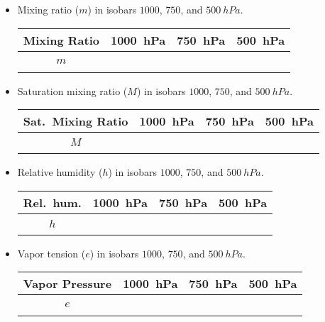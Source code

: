 \documentclass{article}
\begin{document}
\begin{itemize}

\item Mixing ratio ($m$) in isobars $1000$, $750$, and $\SI{500}{hPa}$.

\begin{tabular}{|c|c|c|c|}
\hline
Mixing Ratio&\SI{1000}{hPa} &\SI{750}{hPa} &\SI{500}{hPa} \\
\hline
$m$ &~\hspace{2.25cm}~&~\hspace{2.25cm}~&~\hspace{2.25cm}~\\
\hline
\end{tabular}


\item Saturation mixing ratio ($M$) in isobars $1000$, $750$, and $\SI{500}{hPa}$.

\begin{tabular}{|c|c|c|c|}
\hline
Sat.~Mixing Ratio&\SI{1000}{hPa} &\SI{750}{hPa} &\SI{500}{hPa} \\
\hline
$M$ &~\hspace{2.25cm}~&~\hspace{2.25cm}~&~\hspace{2.25cm}~\\
\hline
\end{tabular}


\item Relative humidity ($h$) in isobars $1000$, $750$, and $\SI{500}{hPa}$.

\begin{tabular}{|c|c|c|c|}
\hline
Rel.~hum.&\SI{1000}{hPa} &\SI{750}{hPa} &\SI{500}{hPa} \\
\hline
$h$ &~\hspace{2.25cm}~&~\hspace{2.25cm}~&~\hspace{2.25cm}~\\
\hline
\end{tabular}

\item Vapor tension ($e$) in isobars $1000$, $750$, and $\SI{500}{hPa}$.

\begin{tabular}{|c|c|c|c|}
\hline
Vapor Pressure&\SI{1000}{hPa} &\SI{750}{hPa} &\SI{500}{hPa} \\
\hline
$e$ &~\hspace{2.25cm}~&~\hspace{2.25cm}~&~\hspace{2.25cm}~\\
\hline
\end{tabular}

\end{itemize}
\end{document}

